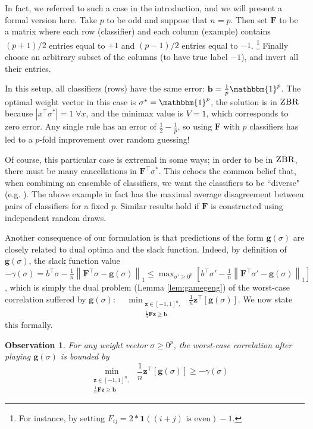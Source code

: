 \documentclass{colt2019} %
\newtheorem{obs}[thm]{Observation}
\newcommand{\ones}[1]{\mathbbm{1}^{#1}}
\newcommand{\vF}{\mathbf{F}}
\newcommand{\vb}{\mathbf{b}}
\newcommand{\vg}{\mathbf{g}}
\newcommand{\vz}{\mathbf{z}}
\newcommand{\vnorm}[1]{\left\lVert#1\right\rVert} %
\newcommand{\ifn}{\mathbf{1}} %
\newcommand{\abs}[1]{\left| #1 \right|}
\newcommand{\zbr}{\textsc{ZBR}}
\begin{document}
In fact, we referred to such a case in the introduction, 
and we will present a formal version here. 
Take $p$ to be odd and suppose that $n=p$. 
Then set $\vF$ to be a matrix where each row (classifier) and each column (example)
contains $(p+1)/2$ entries equal to $+1$ and $(p-1)/2$ entries equal to $-1$.
\footnote{For instance, by setting $F_{ij} = 2 * \ifn((i+j) \text{ is even}) - 1$.} 
Finally choose an arbitrary subset of the columns (to have true label $-1$), 
and invert all their entries. 

In this setup, all classifiers (rows) have the same error: $\vb= \frac{1}{p} \ones{p}$. 
The optimal weight vector in this case is $\sigma^*=\ones{p}$, 
the solution is in $\zbr$ because $\abs{x^\top \sigma^*} = 1 \;\forall x$, and the minimax value is $V=1$, 
which corresponds to zero error. 
Any single rule has an error of $\frac{1}{2} - \frac{1}{p}$, 
so using $\vF$ with $p$ classifiers has led to a $p$-fold improvement over random guessing!

Of course, this particular case is extremal in some ways; in order to be in $\zbr$, 
there must be many cancellations in $\vF^\top \sigma^*$. 
This echoes the common belief that, when combining an ensemble of classifiers, 
we want the classifiers to be ``diverse" (e.g. \cite{K03}). 
The above example in fact has the maximal average disagreement between pairs of classifiers for a fixed $p$. 
Similar results hold if $\vF$ is constructed using independent random draws.


Another consequence of our formulation 
is that predictions of the form $\vg (\sigma)$ 
are closely related to dual optima and the slack function. 
Indeed, by definition of $\vg (\sigma)$, the slack function value 
$ - \gamma (\sigma) = b^\top \sigma - \frac{1}{n} \vnorm{\vF^\top \sigma - \vg (\sigma)}_1 
\leq \max_{\sigma' \geq 0^p} \left[ b^\top \sigma' - \frac{1}{n} \vnorm{\vF^\top \sigma' - \vg (\sigma)}_1 \right]$, 
which is simply the dual problem (Lemma \ref{lem:gamegeng}) of the worst-case correlation suffered by $\vg (\sigma)$: 
$\displaystyle \quad \min_{\substack{ \vz \in [-1,1]^n , \\ \frac{1}{n} \vF \vz \geq \vb }} \;\frac{1}{n} \vz^\top [\vg (\sigma)]$. 
We now state this formally.

\begin{obs}
\label{obs:slacksubopt}
For any weight vector $\sigma \geq 0^p$, 
the worst-case correlation after playing $\vg (\sigma)$ is bounded by 
$$ \quad \min_{\substack{ \vz \in [-1,1]^n , \\ \frac{1}{n} \vF \vz \geq \vb }} \;\frac{1}{n} \vz^\top [\vg (\sigma)] 
\geq - \gamma (\sigma) $$
\end{obs}
\end{document}
